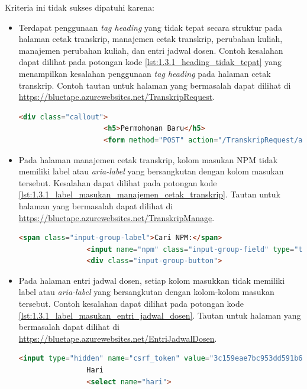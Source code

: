 \documentclass[a4paper,twoside]{article}
\begin{document}
\begin{enumerate}
		Kriteria ini tidak sukses dipatuhi karena:
		\begin{itemize}
			\item Terdapat penggunaan \textit{tag heading} yang tidak tepat secara struktur pada halaman cetak transkrip, manajemen cetak transkrip, perubahan kuliah, manajemen perubahan kuliah, dan entri jadwal dosen. Contoh kesalahan dapat dilihat pada potongan kode \ref{lst:1.3.1_heading_tidak_tepat} yang menampilkan kesalahan penggunaan \textit{tag heading} pada halaman cetak transkrip. Contoh tautan untuk halaman yang bermasalah dapat dilihat di \url{https://bluetape.azurewebsites.net/TranskripRequest}.
			\begin{lstlisting}[frame=single, label={lst:1.3.1_heading_tidak_tepat}, language=HTML, caption=Kriteria Sukses 1.3.1 - Penggunaan \textit{Heading} Tidak Tepat]
				<div class="callout">
					<h5>Permohonan Baru</h5>
					<form method="POST" action="/TranskripRequest/add">
			\end{lstlisting}

			\item Pada halaman manajemen cetak transkrip, kolom masukan NPM tidak memiliki label atau \textit{aria-label} yang bersangkutan dengan kolom masukan tersebut. Kesalahan dapat dilihat pada potongan kode \ref{lst:1.3.1_label_masukan_manajemen_cetak_transkrip}. Tautan untuk halaman yang bermasalah dapat dilihat di \url{https://bluetape.azurewebsites.net/TranskripManage}.
			\begin{lstlisting}[frame=single, label={lst:1.3.1_label_masukan_manajemen_cetak_transkrip}, language=HTML, caption=Kriteria Sukses 1.3.1 - Tidak Terdapat Label pada Kolom Masukan di Halaman Manajemen Cetak Transkrip]
				<span class="input-group-label">Cari NPM:</span>
				<input name="npm" class="input-group-field" type="text" placeholder="2013730013" maxlength="10" minlength="10"/>
				<div class="input-group-button">
			\end{lstlisting}

			\item Pada halaman entri jadwal dosen, setiap kolom masukkan tidak memiliki label atau \textit{aria-label} yang bersangkutan dengan kolom-kolom masukan tersebut. Contoh kesalahan dapat dilihat pada potongan kode \ref{lst:1.3.1_label_masukan_entri_jadwal_dosen}. Tautan untuk halaman yang bermasalah dapat dilihat di \url{https://bluetape.azurewebsites.net/EntriJadwalDosen}.
			\begin{lstlisting}[frame=single, label={lst:1.3.1_label_masukan_entri_jadwal_dosen}, language=HTML, caption=Kriteria Sukses 1.3.1 - Tidak Terdapat Label pada Kolom Masukan di Halaman Entri Jadwal Dosen]
				<input type="hidden" name="csrf_token" value="3c159eae7bc953dd591b679c080ed066"/>
				Hari
				<select name="hari">
			\end{lstlisting}
		\end{itemize} 


\end{enumerate}
\end{document}
